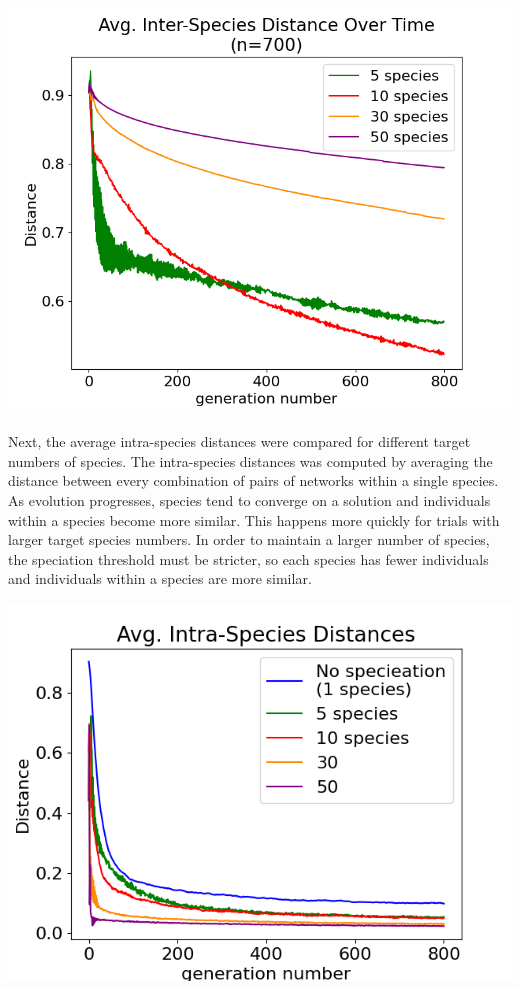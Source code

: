 \documentclass[12pt]{report}
\begin{document}
\begin{center}
    \includegraphics[width=18cm]{images/avg_species_differences.png}
    \label{fig:avg_species_differences}
\end{center}

Next, the average intra-species distances were compared for different target numbers of species. The intra-species distances was computed by averaging the distance between every combination of pairs of networks within a single species. As evolution progresses, species tend to converge on a solution and individuals within a species become more similar. This happens more quickly for trials with larger target species numbers. In order to maintain a larger number of species, the speciation threshold must be stricter, so each species has fewer individuals and individuals within a species are more similar.

\begin{center}
    \includegraphics[width=18cm]{images/intraspecies_distance.png}
    \label{fig:avg_species_differences}
\end{center}
\end{document}
